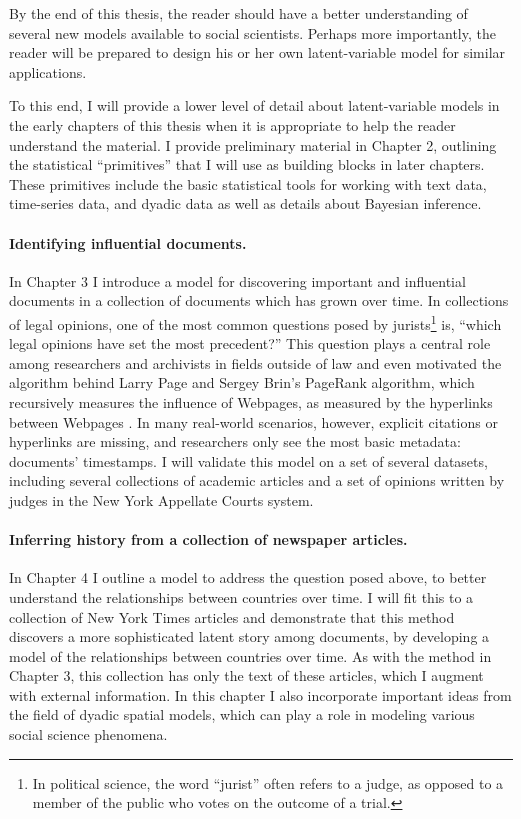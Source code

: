 By the end of this thesis, the reader should have a better
understanding of several new models available to social scientists.
Perhaps more importantly, the reader will be prepared to design his or
her own latent-variable model for similar applications.

To this end, I will provide a lower level of detail about
latent-variable models in the early chapters of this thesis when it is
appropriate to help the reader understand the material.  I provide
preliminary material in Chapter 2, outlining the statistical
``primitives'' that I will use as building blocks in later chapters.
These primitives include the basic statistical tools for working with
text data, time-series data, and dyadic data as well as details about
Bayesian inference.

\paragraph{Identifying influential documents.} In Chapter 3 I
introduce a model for discovering important and influential documents
in a collection of documents which has grown over time.  In
collections of legal opinions, one of the most common questions posed
by jurists\footnote{In political science, the word ``jurist'' often
  refers to a judge, as opposed to a member of the public who votes on
  the outcome of a trial.} is, ``which legal opinions have set the
most precedent?''  This question plays a central role among
researchers and archivists in fields outside of law and even motivated
the algorithm behind Larry Page and Sergey Brin's PageRank algorithm,
which recursively measures the influence of Webpages, as measured by
the hyperlinks between Webpages
\cite{garfield:1992,brin:1998,garfield:2002}.  In many real-world
scenarios, however, explicit citations or hyperlinks are missing, and
researchers only see the most basic metadata: documents' timestamps.
I will validate this model on a set of several datasets, including
several collections of academic articles and a set of opinions written
by judges in the New York Appellate Courts system.

\paragraph{Inferring history from a collection of newspaper articles.}
In Chapter 4 I outline a model to address the question posed above, to
better understand the relationships between countries over time.  I
will fit this to a collection of New York Times articles and
demonstrate that this method discovers a more sophisticated latent
story among documents, by developing a model of the relationships
between countries over time.  As with the method in Chapter 3, this
collection has only the text of these articles, which I augment with
external information.  In this chapter I also incorporate important
ideas from the field of dyadic spatial models, which can play a role
in modeling various social science phenomena.

